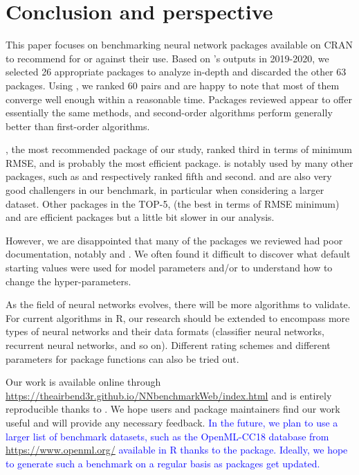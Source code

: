 \hypertarget{conclusion-and-perspective}{%
\section{Conclusion and perspective}\label{conclusion-and-perspective}}

This paper focuses on benchmarking neural network packages available on
CRAN to recommend for or against their use. Based on 's
outputs in 2019-2020, we selected 26 appropriate packages to analyze
in-depth and discarded the other 63 packages. Using ,
we ranked 60  pairs and are happy to note that
most of them converge well enough within a reasonable time. Packages
reviewed appear to offer essentially the same methods, and second-order
algorithms perform generally better than first-order algorithms.

, the most recommended package of our study, ranked third in
terms of minimum RMSE, and is probably the most efficient package.
 is notably used by many other packages, such as
 and  respectively ranked fifth and second.
 and  are also very good challengers in our
benchmark, in particular when considering a larger dataset. Other
packages in the TOP-5,  (the best in terms of RMSE minimum)
and  are efficient packages but a little bit slower in our
analysis.

However, we are disappointed that many of the packages we reviewed had
poor documentation, notably  and . We often
found it difficult to discover what default starting values were used
for model parameters and/or to understand how to change the
hyper-parameters.

As the field of neural networks evolves, there will be more algorithms
to validate. For current algorithms in R, our research should be
extended to encompass more types of neural networks and their data
formats (classifier neural networks, recurrent neural networks, and so
on). Different rating schemes and different parameters for package
functions can also be tried out.

Our work is available online through
\textcolor{blue}{\url{https://theairbend3r.github.io/NNbenchmarkWeb/index.html}}
and is entirely reproducible thanks to . We hope users
and package maintainers find our work useful and will provide any
necessary feedback.
\textcolor{blue}{In the future, we plan to use a larger list of benchmark
datasets, such as the OpenML-CC18 database from \url{https://www.openml.org/}
available in \textsf{R} thanks to the  package.
Ideally, we hope to generate such a benchmark on a regular basis as packages
get updated.}

